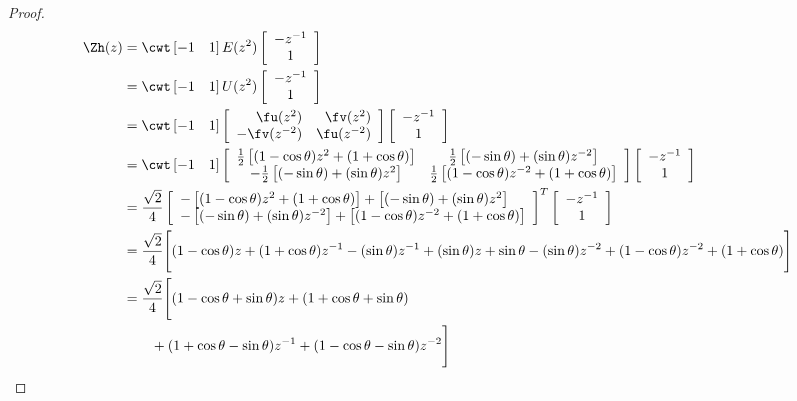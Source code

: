 \begin{proof}
\begin{align*}
  \Zh(z) 
    &= \cwt 
       \left[-1 \quad 1 \right]
       E(z^2)
       \left[\begin{array}{c}-z^{-1}\\ 1 \end{array}\right]
  \\&= \cwt 
       \left[-1 \quad 1 \right]
       U(z^2)
       \left[\begin{array}{c}-z^{-1}\\ 1 \end{array}\right]
  \\&= \cwt 
       \left[-1 \quad 1 \right]
       \left[\begin{array}{rr}
         \fu(z^2)      & \fv(z^2) \\
        -\fv(z^{-2})   & \fu(z^{-2})
       \end{array}\right]
       \left[\begin{array}{c}-z^{-1}\\ 1 \end{array}\right]
  \\&= \cwt 
       \left[-1 \quad 1 \right]
       \left[\begin{array}{cc}
           \frac{1}{2}\left[(1-\cos\theta)z^2 + (1+\cos\theta) \right]
       &   \frac{1}{2}\left[(-\sin\theta) + (\sin\theta)z^{-2} \right]
       \\ -\frac{1}{2}\left[(-\sin\theta) + (\sin\theta)z^{2} \right]
       &   \frac{1}{2}\left[(1-\cos\theta)z^{-2} + (1+\cos\theta) \right]
       \end{array}\right]
       \left[\begin{array}{c}-z^{-1}\\ 1 \end{array}\right]
  \\&= \frac{\sqrt{2}}{4}
       \left[\begin{array}{ll}
          -\left[(1-\cos\theta)z^2 + (1+\cos\theta) \right]
          +\left[(-\sin\theta) + (\sin\theta)z^{2} \right]
       \\ -\left[(-\sin\theta) + (\sin\theta)z^{-2} \right]
          +\left[(1-\cos\theta)z^{-2} + (1+\cos\theta) \right]
       \end{array}\right]^T
       \left[\begin{array}{c}-z^{-1}\\ 1 \end{array}\right]
  \\&= \frac{\sqrt{2}}{4}
       \Bigg[
          (1-\cos\theta)z +(1+\cos\theta)z^{-1}
          -(\sin\theta)z^{-1} +(\sin\theta)z
          + \sin\theta -(\sin\theta)z^{-2}
          +(1-\cos\theta)z^{-2} + (1+\cos\theta)
       \Bigg]
  \\&= \frac{\sqrt{2}}{4}
       \Bigg[
           (1-\cos\theta+\sin\theta)z
          +(1+\cos\theta+\sin\theta)
  \\&\qquad          +(1+\cos\theta-\sin\theta)z^{-1}
          +(1-\cos\theta-\sin\theta)z^{-2}
       \Bigg]
\end{align*}
\end{proof}



